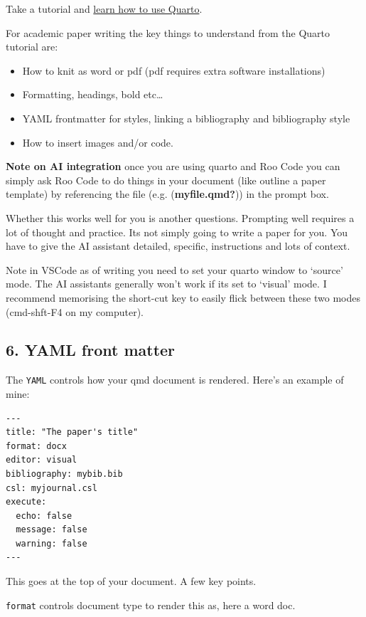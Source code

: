 \documentclass[
  letterpaper,
  DIV=11,
  numbers=noendperiod]{scrreprt}
\providecommand{\tightlist}{%
  \setlength{\itemsep}{0pt}\setlength{\parskip}{0pt}}\usepackage{longtable,booktabs,array}
\begin{document}
Take a tutorial and
\href{https://quarto.org/docs/get-started/hello/rstudio.html}{learn how
to use Quarto}.

For academic paper writing the key things to understand from the Quarto
tutorial are:

\begin{itemize}
\tightlist
\item
  How to knit as word or pdf (pdf requires extra software installations)
\item
  Formatting, headings, bold etc\ldots{}
\item
  YAML frontmatter for styles, linking a bibliography and bibliography
  style
\item
  How to insert images and/or code.
\end{itemize}

\textbf{Note on AI integration} once you are using quarto and Roo Code
you can simply ask Roo Code to do things in your document (like outline
a paper template) by referencing the file (e.g. (\textbf{myfile.qmd?}))
in the prompt box.

Whether this works well for you is another questions. Prompting well
requires a lot of thought and practice. Its not simply going to write a
paper for you. You have to give the AI assistant detailed, specific,
instructions and lots of context.

Note in VSCode as of writing you need to set your quarto window to
`source' mode. The AI assistants generally won't work if its set to
`visual' mode. I recommend memorising the short-cut key to easily flick
between these two modes (cmd-shft-F4 on my computer).

\subsection{6. YAML front matter}\label{yaml-front-matter}

The \texttt{YAML} controls how your qmd document is rendered. Here's an
example of mine:

\begin{verbatim}
---
title: "The paper's title"
format: docx
editor: visual
bibliography: mybib.bib
csl: myjournal.csl
execute: 
  echo: false
  message: false
  warning: false
---
\end{verbatim}

This goes at the top of your document. A few key points.

\texttt{format} controls document type to render this as, here a word
doc.
\end{document}
